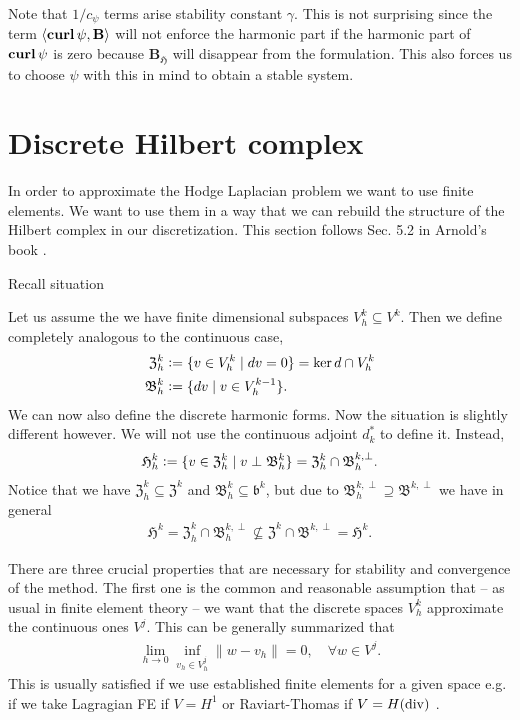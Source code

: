 \documentclass[../master_thesis.tex]{subfiles}
\begin{document}
Note that $1/c_\psi$ terms arise
stability constant $\gamma$. This is not surprising since the term 
$\langle \veccurl \psi, \mathbf{B} \rangle$ will not enforce the harmonic 
part if the harmonic part of $\veccurl \psi$ is zero because 
$\mathbf{B}_\mathfrak{H}$ will disappear from the formulation.
This also forces us to choose $\psi$ with this in mind to obtain a 
stable system.

\section{Discrete Hilbert complex}

In order to approximate the Hodge Laplacian problem we want to use finite elements.
We want to use them in a way that we can rebuild the structure of the Hilbert complex 
in our discretization. This section follows Sec. 5.2 in Arnold's book \cite{arnold}.

Recall situation

Let us assume the we have finite dimensional subspaces $V_h^k \subseteq V^k$. 
Then we define completely analogous to the continuous case,
\begin{align*}
    \mathfrak{Z}_h^k &\vcentcolon= \{ v \in V_h^k \mid d v = 0 \} = \ker d \cap V^k_h
    \\ \mathfrak{B}^k_h &\vcentcolon= \{ dv \mid v \in V_h^{k-1} \}.
\end{align*}
We can now also define the discrete harmonic forms. Now the situation is slightly 
different however. We will not use the continuous adjoint $d^*_k$ to define it.
Instead,
\begin{align*}
    \mathfrak{H}_h^k \vcentcolon= \{ v \in \mathfrak{Z}_h^k \mid v \perp \mathfrak{B}^k_h \}
        = \mathfrak{Z}_h^k \cap \mathfrak{B}_h^{k,\perp}.
\end{align*}
Notice that we have $\mathfrak{Z}_h^k \subseteq \mathfrak{Z}^k$ and 
$\mathfrak{B}_h^k \subseteq \mathfrak{b}^k$, but due to 
$\mathfrak{B}_h^{k,\perp} \supseteq \mathfrak{B}^{k,\perp}$ we have in general
\begin{align*}
    \mathfrak{H}^k = \mathfrak{Z}_h^k \cap \mathfrak{B}_h^{k,\perp} 
    \not\subseteq    \mathfrak{Z}^k \cap \mathfrak{B}^{k,\perp} = \mathfrak{H}^k.
\end{align*}


There are three crucial properties that are necessary for stability and convergence 
of the method. The first one is the common and reasonable assumption that 
-- as usual in finite element theory -- we want that the discrete spaces $V_h^k$
approximate the continuous ones $V^j$. This can be generally summarized that 
\begin{align*}
    \lim_{h \rightarrow 0} \inf_{v_h \in V_h^j} \lVert w - v_h \rVert = 0, \quad \forall w \in V^j.
\end{align*}
This is usually satisfied if we use established finite elements for a given space 
e.g. if we take Lagragian FE if $V = H^1$ or Raviart-Thomas if $V=H(\operatorname{div})$ \cite{}.
\end{document}
